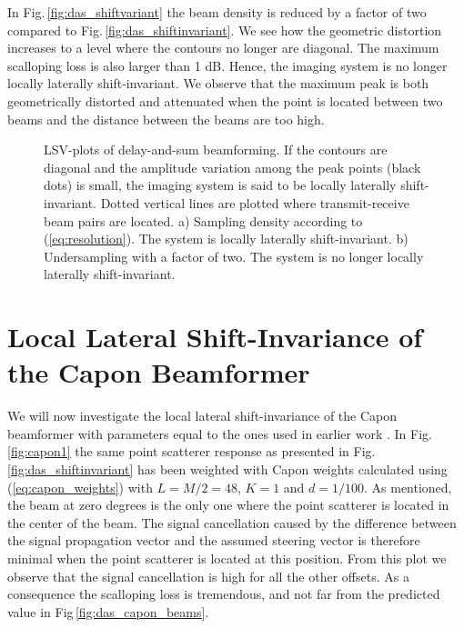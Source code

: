 \documentclass[journal]{IEEEtran}
\newcommand{\img}{img/}
\begin{document}
In Fig.\,\ref{fig:das_shiftvariant} the beam density is reduced by a factor of two compared to Fig.\,\ref{fig:das_shiftinvariant}. We see how the geometric distortion increases to a level where the contours no longer are diagonal. The maximum scalloping loss is also larger than 1 dB. Hence, the imaging system is no longer locally laterally shift-invariant. We observe that the maximum peak is both geometrically distorted and attenuated when the point is located between two beams and the distance between the beams are too high.

\begin{figure}[!t]
\centerline{
\hfill{}
}
\caption{LSV-plots of delay-and-sum beamforming. If the contours are diagonal and the amplitude variation among the peak points (black dots) is small, the imaging system is said to be locally laterally shift-invariant. Dotted vertical lines are plotted where transmit-receive beam pairs are located. a) Sampling density according to (\ref{eq:resolution}). The system is locally laterally shift-invariant. b) Undersampling with a factor of two. The system is no longer locally laterally shift-invariant.}
\label{fig:das}
\end{figure}

\section{Local Lateral Shift-Invariance of the Capon Beamformer}\label{sec:capon_LLSI}
We will now investigate the local lateral shift-invariance of the Capon beamformer with parameters equal to the ones used in earlier work \cite{Synnevag2009, Asen}. In Fig.\,\ref{fig:capon1} the same point scatterer response as presented in Fig.\,\ref{fig:das_shiftinvariant} has been weighted with Capon weights calculated using (\ref{eq:capon_weights}) with $L = M/2 = 48$, $K=1$ and $d=1/100$. As mentioned, the beam at zero degrees is the only one where the point scatterer is located in the center of the beam. The signal cancellation caused by the difference between the signal propagation vector and the assumed steering vector is therefore minimal when the point scatterer is located at this position. From this plot we observe that the signal cancellation is high for all the other offsets. As a consequence the scalloping loss is tremendous, and not far from the predicted value in Fig\,\ref{fig:das_capon_beams}. %
\end{document}
